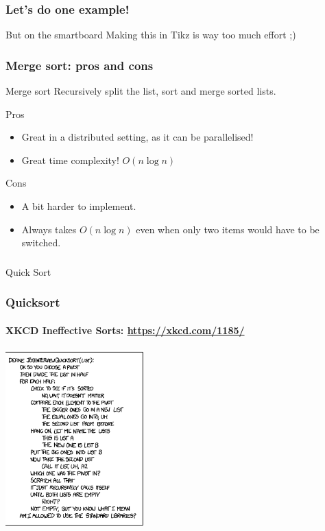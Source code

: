 \begin{frame}
	\frametitle{Let's do one example!}
	\begin{block}{But on the smartboard}
		Making this in Tikz is way too much effort ;)
	\end{block}		
\end{frame}

\begin{frame}
	\frametitle{Merge sort: pros and cons}
	\begin{block}{Merge sort}
			Recursively split the list, sort and merge sorted lists.
		\end{block}	
		\begin{block}{Pros}
			\begin{itemize}
				\item Great in a distributed setting, as it can be parallelised!
				\item Great time complexity! $O(n\log n)$
			\end{itemize}
		\end{block}	
		\begin{block}{Cons}
			\begin{itemize}
				\item A bit harder to implement.
				\item Always takes $O(n \log n)$ even when only two items would have to be switched.
			\end{itemize}
		\end{block}	
\end{frame}

\begin{frame}[fragile]\frametitle{}
\begin{center}
{\Large Quick Sort}
\end{center}

\end{frame}


\begin{frame}
	\frametitle{Quicksort}
	\framesubtitle{XKCD Ineffective Sorts: \url{https://xkcd.com/1185/}}
	\begin{center}
		\includegraphics[width=0.4\textwidth]{images/quicksort.png}\\
	\end{center}
\end{frame}

